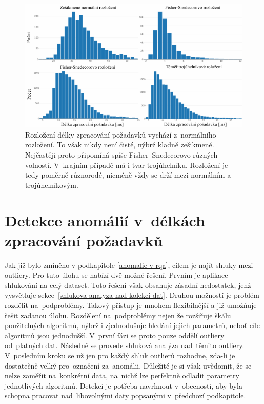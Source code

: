 \begin{figure}[hbt]
    \centering
    \includegraphics[width=1\textwidth]{obrazky/rqa-data-distribution.pdf}
    \caption{Rozložení délky zpracování požadavků vychází z~normálního rozložení. To však nikdy není čisté, nýbrž kladně zešikmené. Nejčastěji proto připomíná spíše Fisher–Snedecorovo různých volností. V~krajním případě má i tvar trojúhelníku. Rozložení je tedy poměrně různorodé, nicméně vždy se drží mezi normálním a trojúhelníkovým.}
    \label{data-img}
\end{figure}

\section{Detekce anomálií v~délkách zpracování požadavků}
\label{detekce-anomalii-v-delkach-pozadavku}
Jak již bylo zmíněno v podkapitole \ref{anomalie-v-rqa}, cílem je najít shluky mezi outliery. Pro tuto úlohu se nabízí dvě možné řešení. Prvním je aplikace shlukování na celý dataset. Toto řešení však obsahuje zásadní nedostatek, jenž vysvětluje sekce~\ref{shlukova-analyza-nad-kolekci-dat}. Druhou možností je problém rozdělit na~podproblémy. Takový přístup je mnohem flexibilnější a již umožňuje řešit zadanou úlohu. Rozdělení na~podproblémy nejen že rozšiřuje škálu použitelných algoritmů, nýbrž i zjednodušuje hledání jejich parametrů, neboť cíle algoritmů jsou jednodušší. V~první fázi se proto pouze oddělí outliery od~platných dat. Následně se provede shluková analýza nad~těmito outliery. V~posledním kroku se už jen pro každý shluk outlierů rozhodne, zda-li je dostatečně velký pro~označení za~anomálii. Důležité je si však uvědomit, že se nelze zaměřit na~konkrétní data, na~nichž lze perfektně odladit parametry jednotlivých algoritmů. Detekci je potřeba  navrhnout v~obecnosti, aby byla schopna pracovat nad~libovolnými daty popsanými v~předchozí podkapitole.

